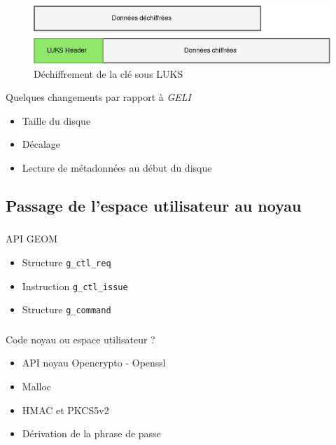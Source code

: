 \begin{frame}
	\frametitle{\insertsubsectionhead{}}
	\begin{figure}
		\includegraphics[width=.9\textwidth]{developpement/creation_disque}
		\caption{Déchiffrement de la clé sous LUKS}
	\end{figure}
	\begin{block}{Quelques changements par rapport à \textit{GELI}}
		\begin{itemize}
			\item Taille du disque
				\pause
			\item Décalage
				\pause
			\item Lecture de métadonnées au début du disque
		\end{itemize}
	\end{block}
\end{frame}

\subsection{Passage de l'espace utilisateur au noyau}

\begin{frame}
	\frametitle{\insertsubsectionhead{}}
	\begin{block}{API GEOM}
		\begin{itemize}
			\item Structure \texttt{g\_ctl\_req}
			\item Instruction \texttt{g\_ctl\_issue}
			\item Structure \texttt{g\_command}
		\end{itemize}
	\end{block}
\end{frame}

\begin{frame}
	\frametitle{\insertsubsectionhead{}}
	\begin{block}{Code noyau ou espace utilisateur ?}
		\begin{itemize}
			\item API noyau Opencrypto - Openssl
			\item Malloc
			\item HMAC et PKCS5v2
			\item Dérivation de la phrase de passe
		\end{itemize}
	\end{block}
\end{frame}

